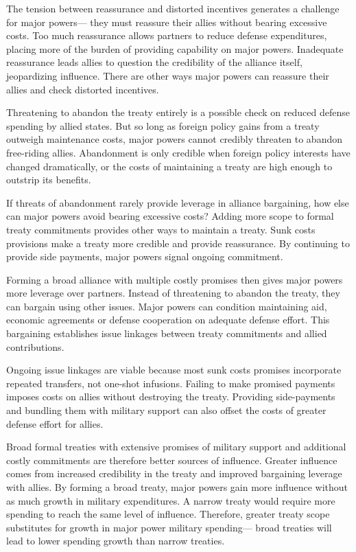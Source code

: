 \documentclass[12pt]{article}
\begin{document}
The tension between reassurance and distorted incentives generates a challenge for major powers--- they must reassure their allies without bearing excessive costs.
Too much reassurance allows partners to reduce defense expenditures, placing more of the burden of providing capability on major powers. 
Inadequate reassurance leads allies to question the credibility of the alliance itself, jeopardizing influence.   
There are other ways major powers can reassure their allies and check distorted incentives. 


Threatening to abandon the treaty entirely is a possible check on reduced defense spending by allied states. 
But so long as foreign policy gains from a treaty outweigh maintenance costs, major powers cannot credibly threaten to abandon free-riding allies. 
Abandonment is only credible when foreign policy interests have changed dramatically, or the costs of maintaining a treaty are high enough to outstrip its benefits. 


If threats of abandonment rarely provide leverage in alliance bargaining, how else can major powers avoid bearing excessive costs? 
Adding more scope to formal treaty commitments provides other ways to maintain a treaty.
Sunk costs provisions make a treaty more credible and provide reassurance.
By continuing to provide side payments, major powers signal ongoing commitment. 

 
Forming a broad alliance with multiple costly promises then gives major powers more leverage over partners. 
Instead of threatening to abandon the treaty, they can bargain using other issues. 
Major powers can condition maintaining aid, economic agreements or defense cooperation on adequate defense effort.
This bargaining establishes issue linkages between treaty commitments and allied contributions. 


Ongoing issue linkages are viable because most sunk costs promises incorporate repeated transfers, not one-shot infusions. 
Failing to make promised payments imposes costs on allies without destroying the treaty. 
Providing side-payments and bundling them with military support can also offset the costs of greater defense effort for allies. 


Broad formal treaties with extensive promises of military support and additional costly commitments are therefore better sources of influence.
Greater influence comes from increased credibility in the treaty and improved bargaining leverage with allies.  
By forming a broad treaty, major powers gain more influence without as much growth in military expenditures. 
A narrow treaty would require more spending to reach the same level of influence. 
Therefore, greater treaty scope substitutes for growth in major power military spending--- broad treaties will lead to lower spending growth than narrow treaties. 
\end{document}
